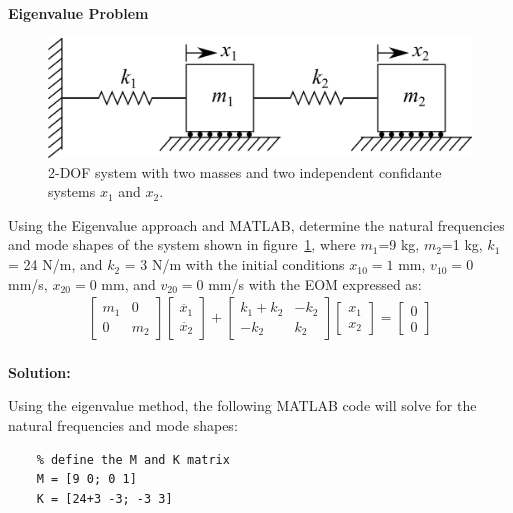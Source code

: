 \documentclass[12pt,letter]{article}
\begin{document}
	\begin{example}
	\textbf{Eigenvalue Problem}
	
	\begin{figure}[H]
		\centering
		\includegraphics[]{../figures/2-DOF-spring_mass_horizontal.png}
		\caption{2-DOF system with two masses and two independent confidante systems $x_1$ and $x_2$.}
		\label{fig:2-DOF-spring_mass_horizontal_2}
	\end{figure}
	
	Using the Eigenvalue approach and MATLAB, determine the natural frequencies and mode shapes of the system shown in figure~\ref{fig:2-DOF-spring_mass_horizontal_2}, where $m_1$=9 kg, $m_2$=1 kg, $k_1$ = 24 N/m, and $k_2$ = 3 N/m with the initial conditions $x_{10}=1$ mm, $v_{10}=0$ mm/s, $x_{20}=0$ mm, and $v_{20}=0$ mm/s with the EOM expressed as: 
	\begin{eqnarray}
	  \begin{bmatrix} m_1 & 0  \\  0 & m_2 \end{bmatrix}\begin{bmatrix} \ddot{x_1} \\  \ddot{x_2} \end{bmatrix} + \begin{bmatrix} k_1+k_2 & -k_2  \\  -k_2 & k_2 \end{bmatrix}\begin{bmatrix} x_1 \\  x_2 \end{bmatrix} = \begin{bmatrix} 0 \\  0 \end{bmatrix}
	\end{eqnarray} \\

	\noindent \textbf{Solution:} 

	Using the eigenvalue method, the following MATLAB code will solve for the natural frequencies and mode shapes:
	
	\lstset{linewidth=5.8in}
	\begin{minipage}{1\textwidth}
		\begin{center}
			\begin{lstlisting}
	% define the M and K matrix
	M = [9 0; 0 1]
	K = [24+3 -3; -3 3]
	

\end{lstlisting}
\end{center}
\end{minipage}
\end{example}
\end{document}

